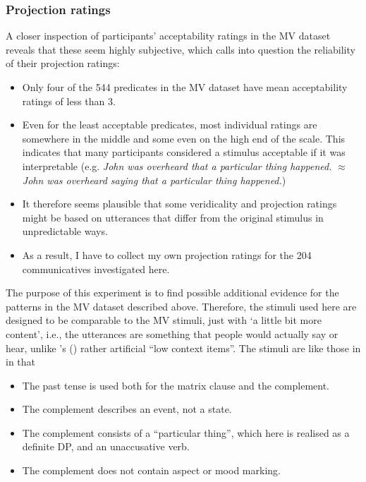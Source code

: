 \documentclass[11pt,fleqn]{article}
\newcommand{\6}{\mbox{$[\hspace*{-.6mm}[$}}
\newcommand{\9}{\mbox{$]\hspace*{-.6mm}]$}}
\newcommand{\citepos}[1]{\citeauthor{#1}'s (\citeyear{#1})}
\begin{document}
\subsubsection{Projection ratings}
A closer inspection of participants’ acceptability ratings in the MV dataset reveals that these seem highly subjective, which calls into question the reliability of their projection ratings:
\begin{itemize}
	\item Only four of the 544 predicates in the MV dataset have mean acceptability ratings of less than 3. 
	\item Even for the least acceptable predicates, most individual ratings are somewhere in the middle and some even on the high end of the scale. This indicates that many participants considered a stimulus acceptable if it was interpretable (e.g. \emph{John was overheard that a particular thing happened.} $\approx$ \emph{John was overheard saying that a particular thing happened.}) 
	\item It therefore seems plausible that some veridicality and projection ratings might be based on utterances that differ from the original stimulus in unpredictable ways. 
	\item As a result, I have to collect my own projection ratings for the 204 communicatives investigated here.
\end{itemize}

The purpose of this experiment is to find possible additional evidence for the patterns in the MV dataset described above. Therefore, the stimuli used here are designed to be comparable to the MV stimuli, just with ‘a little bit more content’, i.e., the utterances are something that people would actually say or hear, unlike \citepos{white-rawlins-nels2018} rather artificial ``low context items”. The stimuli are like those in \cite{white-rawlins-nels2018} in that 
\begin{itemize}
	\item The past tense is used both for the matrix clause and the complement.
	\item The complement describes an event, not a state.
	\item The complement consists of a ``particular thing”, which here is realised as a definite DP, and an unaccusative verb.
	\item The complement does not contain aspect or mood marking.
\end{itemize}
\end{document}

